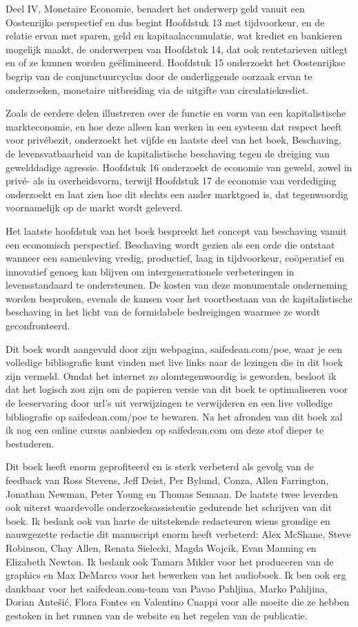 Deel IV, Monetaire Economie, benadert het onderwerp geld vanuit een Oostenrijks perspectief en dus begint Hoofdstuk 13 met tijdvoorkeur, en de relatie ervan met sparen, geld en kapitaalaccumulatie, wat krediet en bankieren mogelijk maakt, de onderwerpen van Hoofdstuk 14, dat ook rentetarieven uitlegt en of ze kunnen worden geëlimineerd. Hoofdstuk 15 onderzoekt het Oostenrijkse begrip van de conjunctuurcyclus door de onderliggende oorzaak ervan te onderzoeken, monetaire uitbreiding via de uitgifte van circulatiekrediet.

Zoals de eerdere delen illustreren over de functie en vorm van een kapitalistische markteconomie, en hoe deze alleen kan werken in een systeem dat respect heeft voor privébezit, onderzoekt het vijfde en laatste deel van het boek, Beschaving, de levensvatbaarheid van de kapitalistische beschaving tegen de dreiging van gewelddadige agressie. Hoofdstuk 16 onderzoekt de economie van geweld, zowel in privé- als in overheidsvorm, terwijl Hoofdstuk 17 de economie van verdediging onderzoekt en laat zien hoe dit slechts een ander marktgoed is, dat tegenwoordig voornamelijk op de markt wordt geleverd.

Het laatste hoofdstuk van het boek bespreekt het concept van beschaving vanuit een economisch perspectief. Beschaving wordt gezien als een orde die ontstaat wanneer een samenleving vredig, productief, laag in tijdvoorkeur, coöperatief en innovatief genoeg kan blijven om intergenerationele verbeteringen in levensstandaard te ondersteunen. De kosten van deze monumentale onderneming worden besproken, evenals de kansen voor het voortbestaan van de kapitalistische beschaving in het licht van de formidabele bedreigingen waarmee ze wordt geconfronteerd.

Dit boek wordt aangevuld door zijn webpagina, saifedean.com/poe, waar je een volledige bibliografie kunt vinden met live links naar de lezingen die in dit boek zijn vermeld. Omdat het internet zo alomtegenwoordig is geworden, besloot ik dat het logisch zou zijn om de papieren versie van dit boek te optimaliseren voor de leeservaring door url's uit verwijzingen te verwijderen en een live volledige bibliografie op saifedean.com/poe te bewaren. Na het afronden van dit boek zal ik nog een online cursus aanbieden op saifedean.com om deze stof dieper te bestuderen.

Dit boek heeft enorm geprofiteerd en is sterk verbeterd als gevolg van de feedback van Ross Stevens, Jeff Deist, Per Bylund, Conza, Allen Farrington, Jonathan Newman, Peter Young en Thomas Semaan. De laatste twee leverden ook uiterst waardevolle onderzoeksassistentie gedurende het schrijven van dit boek. Ik bedank ook van harte de uitstekende redacteuren wiens grondige en nauwgezette redactie dit manuscript enorm heeft verbeterd: Alex McShane, Steve Robinson, Chay Allen, Renata Sielecki, Magda Wojcik, Evan Manning en Elizabeth Newton. Ik bedank ook Tamara Mikler voor het produceren van de graphics en Max DeMarco voor het bewerken van het audioboek. Ik ben ook erg dankbaar voor het saifedean.com-team van Pavao Pahljina, Marko Pahljina, Dorian Antešić, Flora Fontes en Valentino Cnappi voor alle moeite die ze hebben gestoken in het runnen van de website en het regelen van de publicatie.

